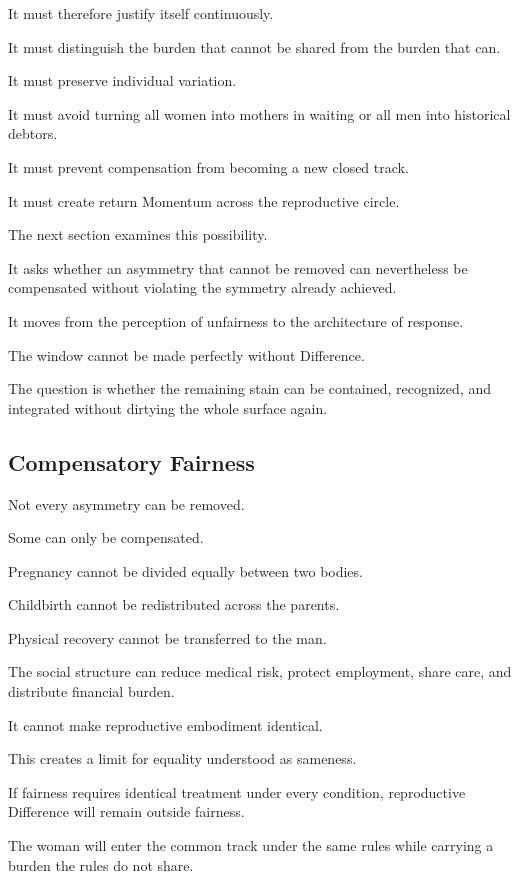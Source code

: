 It must therefore justify itself continuously.

It must distinguish the burden that cannot be shared from the burden that can.

It must preserve individual variation.

It must avoid turning all women into mothers in waiting or all men into historical debtors.

It must prevent compensation from becoming a new closed track.

It must create return Momentum across the reproductive circle.

The next section examines this possibility.

It asks whether an asymmetry that cannot be removed can nevertheless be compensated without violating the symmetry already achieved.

It moves from the perception of unfairness to the architecture of response.

The window cannot be made perfectly without Difference.

The question is whether the remaining stain can be contained, recognized, and integrated without dirtying the whole surface again.

\subsection*{\textbf{Compensatory Fairness}}

Not every asymmetry can be removed.

Some can only be compensated.

Pregnancy cannot be divided equally between two bodies.

Childbirth cannot be redistributed across the parents.

Physical recovery cannot be transferred to the man.

The social structure can reduce medical risk, protect employment, share care, and distribute financial burden.

It cannot make reproductive embodiment identical.

This creates a limit for equality understood as sameness.

If fairness requires identical treatment under every condition, reproductive Difference will remain outside fairness.

The woman will enter the common track under the same rules while carrying a burden the rules do not share.

